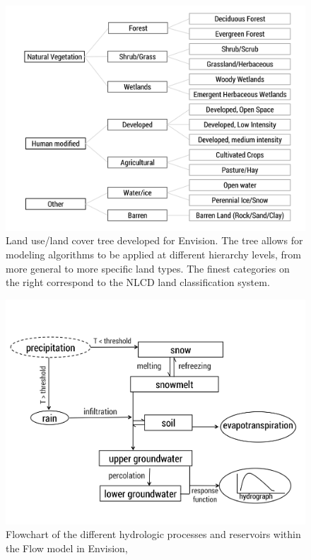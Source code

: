 \documentclass[11pt,letterpaper]{article}
\begin{document}
\begin{figure}
\centering
\includegraphics[width=\textwidth]{figure-files/figure2.png}
\caption{Land use/land cover tree developed for Envision. The tree allows for modeling algorithms to be applied at different hierarchy levels, from more general to more specific land types. The finest categories on the right correspond to the NLCD land classification system.}
\label{fig:LULCtree}
\end{figure}
\clearpage

\begin{figure}
\centering
\includegraphics[width=\textwidth]{figure-files/figure3.png}
\caption{Flowchart of the different hydrologic processes and reservoirs within the Flow model in Envision, \citep[modified from][]{Han:2017tx}}
\label{fig:ModelFlowchart}
\end{figure}
\clearpage
\end{document}
